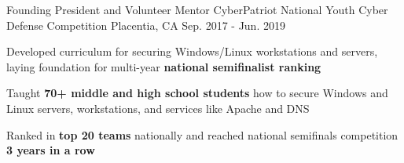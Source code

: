 \begin{cventries}
  \cventry
    {Founding President and Volunteer Mentor} %
    {CyberPatriot National Youth Cyber Defense Competition} %
    {Placentia, CA} %
    {Sep. 2017 - Jun. 2019} %
    {
      \begin{cvitems} %
        \item {Developed curriculum for securing Windows/Linux workstations and servers, laying foundation for multi-year \textbf{national semifinalist ranking}}
        \item {Taught \textbf{70+ middle and high school students} how to secure Windows and Linux servers, workstations, and services like Apache and DNS}
        \item {Ranked in \textbf{top 20 teams} nationally and reached national semifinals competition \textbf{3 years in a row}}
      \end{cvitems}
    }

\end{cventries}
